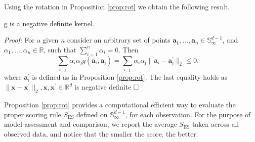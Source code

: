 Using the rotation in Proposition \ref{prop:rot} we obtain the following result.
    \begin{prop}\label{prop:g}
    g is a negative definite kernel.
    \end{prop}
    {\em Proof:} For a given $n$ consider an arbitrary set of points
    $\bm{a}_1, \ldots , \bm{a}_n \in {\mathbb S}_\infty^{d-1}$, and 
    $\alpha_1, \ldots , \alpha_n \in {\mathbb R}$, such that $\sum_{i=1}^n
    \alpha _i = 0$. Then
    \[
    \sum_{i,\jmath} \alpha_i \alpha_\jmath g(\bm{a}_i, \bm{a}_\jmath) 
        = \sum_{i,\jmath} \alpha_i \alpha_\jmath 
    \|\bm{a}_i - \bm{a}_\jmath^\prime\|_2 \leq 0,
    \]
    where $\bm{a}_\jmath^\prime$ is defined as in Proposition \ref{prop:rot}. 
    The last equality holds as $\|\bm{x} - \bm{x}^\prime\|_2, \bm{x},
    \bm{x}^{\prime} \in {\mathbb R}^d$ is negative definite
    \citep{gneiting2007}$\hfill\Box$

Proposition \ref{prop:rot} provides a computational efficient way to evaluate the proper
    scoring rule $S_{\text{ES}}$ defined on ${\mathbb S}_\infty^{d-1}$, for each 
    observation. For the purpose of model assessment and comparison, we report the 
    average $S_{\text{ES}}$ taken across all observed data, and notice that the smaller 
    the score, the better.
    
